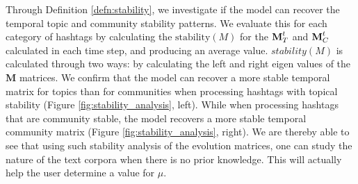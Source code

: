 
Through Definition \ref{defn:stability}, we investigate if the model can recover the
temporal topic and community stability patterns.  We evaluate this for each category of hashtags
by calculating the $\text{stability}(M)$
for the $\textbf{M}^t_T$ and $\textbf{M}^t_C$ calculated in each time step, and producing an average value.
$stability(M)$ is calculated through two ways: by calculating the left and right
eigen values of the $\mathbf{M}$ matrices.
We confirm that the model can recover a more stable temporal matrix for topics than for 
communities when processing hashtags with topical stability (Figure \ref{fig:stability_analysis}, left).  
While when processing hashtags that are community stable, the model recovers a more stable temporal 
community matrix (Figure \ref{fig:stability_analysis}, right).  We are thereby able to
see that using such stability analysis of the evolution matrices, one can study the nature
of the text corpora when there is no prior knowledge.  This will actually help the user
determine a value for $\mu$.
